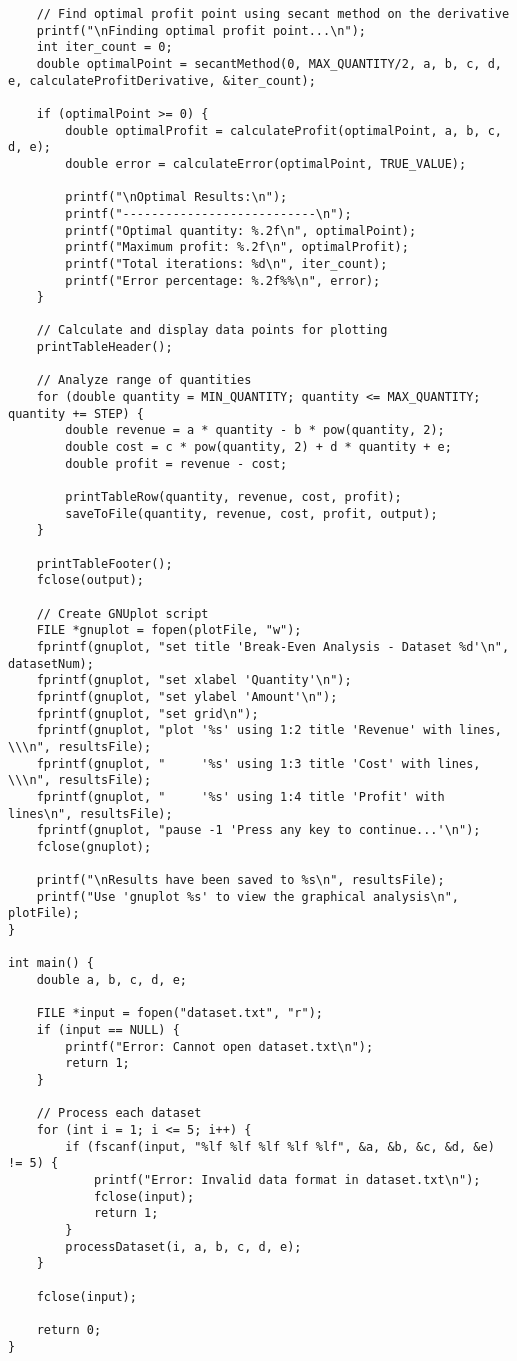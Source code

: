 \documentclass[conference]{IEEEtran}
\begin{document}
\begin{verbatim}
    // Find optimal profit point using secant method on the derivative
    printf("\nFinding optimal profit point...\n");
    int iter_count = 0;
    double optimalPoint = secantMethod(0, MAX_QUANTITY/2, a, b, c, d, e, calculateProfitDerivative, &iter_count);
    
    if (optimalPoint >= 0) {
        double optimalProfit = calculateProfit(optimalPoint, a, b, c, d, e);
        double error = calculateError(optimalPoint, TRUE_VALUE);
        
        printf("\nOptimal Results:\n");
        printf("---------------------------\n");
        printf("Optimal quantity: %.2f\n", optimalPoint);
        printf("Maximum profit: %.2f\n", optimalProfit);
        printf("Total iterations: %d\n", iter_count);
        printf("Error percentage: %.2f%%\n", error);
    }

    // Calculate and display data points for plotting
    printTableHeader();

    // Analyze range of quantities
    for (double quantity = MIN_QUANTITY; quantity <= MAX_QUANTITY; quantity += STEP) {
        double revenue = a * quantity - b * pow(quantity, 2);
        double cost = c * pow(quantity, 2) + d * quantity + e;
        double profit = revenue - cost;

        printTableRow(quantity, revenue, cost, profit);
        saveToFile(quantity, revenue, cost, profit, output);
    }
    
    printTableFooter();
    fclose(output);

    // Create GNUplot script
    FILE *gnuplot = fopen(plotFile, "w");
    fprintf(gnuplot, "set title 'Break-Even Analysis - Dataset %d'\n", datasetNum);
    fprintf(gnuplot, "set xlabel 'Quantity'\n");
    fprintf(gnuplot, "set ylabel 'Amount'\n");
    fprintf(gnuplot, "set grid\n");
    fprintf(gnuplot, "plot '%s' using 1:2 title 'Revenue' with lines, \\\n", resultsFile);
    fprintf(gnuplot, "     '%s' using 1:3 title 'Cost' with lines, \\\n", resultsFile);
    fprintf(gnuplot, "     '%s' using 1:4 title 'Profit' with lines\n", resultsFile);
    fprintf(gnuplot, "pause -1 'Press any key to continue...'\n");
    fclose(gnuplot);

    printf("\nResults have been saved to %s\n", resultsFile);
    printf("Use 'gnuplot %s' to view the graphical analysis\n", plotFile);
}

int main() {
    double a, b, c, d, e;
    
    FILE *input = fopen("dataset.txt", "r");
    if (input == NULL) {
        printf("Error: Cannot open dataset.txt\n");
        return 1;
    }

    // Process each dataset
    for (int i = 1; i <= 5; i++) {
        if (fscanf(input, "%lf %lf %lf %lf %lf", &a, &b, &c, &d, &e) != 5) {
            printf("Error: Invalid data format in dataset.txt\n");
            fclose(input);
            return 1;
        }
        processDataset(i, a, b, c, d, e);
    }

    fclose(input);

    return 0;
}

\end{verbatim}
\end{document}
